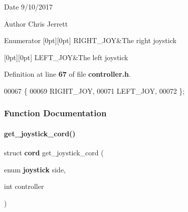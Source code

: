 \begin{DoxyDate}{Date}
9/10/2017 
\end{DoxyDate}
\begin{DoxyAuthor}{Author}
Chris Jerrett 
\end{DoxyAuthor}
\begin{DoxyEnumFields}{Enumerator}
[0pt][0pt]{}\mbox{\label{controller_8h_ac365c9e892abe4a1b85ae8f56a4eae5aae08a2d362c677f96f72d93047513cafe}} 
R\+I\+G\+H\+T\+\_\+\+J\+OY&The right joystick \\
\hline

[0pt][0pt]{}\mbox{\label{controller_8h_ac365c9e892abe4a1b85ae8f56a4eae5aaf822d7888862e67a3c624775b85c50a9}} 
L\+E\+F\+T\+\_\+\+J\+OY&The left joystick \\
\hline

\end{DoxyEnumFields}


Definition at line \textbf{ 67} of file \textbf{ controller.\+h}.


\begin{DoxyCode}
00067               \{
00069   RIGHT_JOY,
00071   LEFT_JOY,
00072 \};
\end{DoxyCode}


\subsubsection{Function Documentation}
\mbox{\label{controller_8h_a0ce0176099c0bb15ad8c36123222059d}} 
\paragraph{get\+\_\+joystick\+\_\+cord()}
{\footnotesize\ttfamily struct \textbf{ cord} get\+\_\+joystick\+\_\+cord (\begin{DoxyParamCaption}\item[{enum \textbf{ joystick}}]{side,  }\item[{int}]{controller }\end{DoxyParamCaption})}



